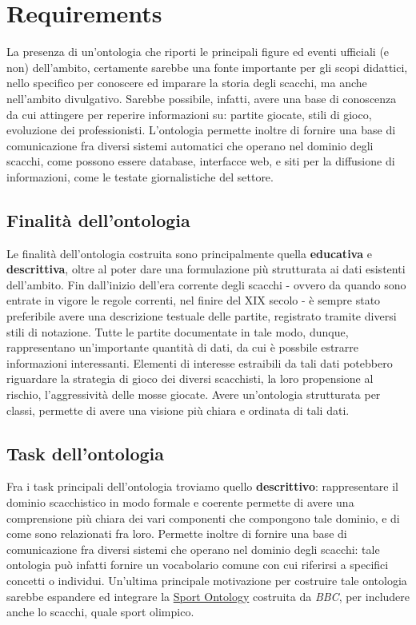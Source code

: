 \documentclass[12pt]{book}
\begin{document}
\chapter{Requirements}

La presenza di un'ontologia che riporti le principali figure ed eventi
ufficiali (e non) dell'ambito, certamente sarebbe una fonte importante
per gli scopi didattici, nello specifico per conoscere ed imparare la
storia degli scacchi, ma anche nell'ambito divulgativo. Sarebbe
possibile, infatti, avere una base di conoscenza da cui attingere per
reperire informazioni su: partite giocate, stili di gioco, evoluzione
dei professionisti.
L'ontologia permette inoltre di fornire una base di
comunicazione fra diversi sistemi automatici che operano nel dominio degli
scacchi, come possono essere database, interfacce web, e siti per la
diffusione di informazioni, come le testate giornalistiche del settore.

\section{Finalità dell'ontologia}

Le finalità dell'ontologia costruita sono principalmente
quella \textbf{educativa} e \textbf{descrittiva}, oltre al poter dare
una formulazione più strutturata ai dati esistenti dell'ambito.
Fin dall'inizio dell'era corrente degli scacchi - ovvero da quando
sono entrate in vigore le regole correnti, nel finire del XIX secolo -
è sempre stato preferibile avere una descrizione testuale delle partite,
registrato tramite diversi stili di notazione. Tutte le partite
documentate in tale modo, dunque, rappresentano un'importante quantità di
dati, da cui è possbile estrarre informazioni interessanti. 
Elementi di interesse estraibili da tali dati potebbero riguardare la strategia di
gioco dei diversi scacchisti, la loro propensione al rischio, l'aggressività
delle mosse giocate. Avere un'ontologia strutturata per classi,
permette di avere una visione più chiara e ordinata di tali dati.

\section{Task dell'ontologia}

Fra i task principali dell'ontologia troviamo quello
\textbf{descrittivo}: rappresentare il dominio scacchistico in modo
formale e coerente permette di avere una comprensione più chiara dei
vari componenti che compongono tale dominio, e di come sono
relazionati fra loro. Permette inoltre di fornire una base di
comunicazione fra diversi sistemi che operano nel dominio degli
scacchi: tale ontologia può infatti fornire un vocabolario comune con
cui riferirsi a specifici concetti o individui. Un'ultima principale
motivazione per costruire tale ontologia sarebbe espandere ed
integrare la 
\href{https://www.bbc.co.uk/ontologies/sport-ontology/}{Sport Ontology} costruita da \textit{BBC}, per includere anche
lo scacchi, quale sport olimpico.
\end{document}
